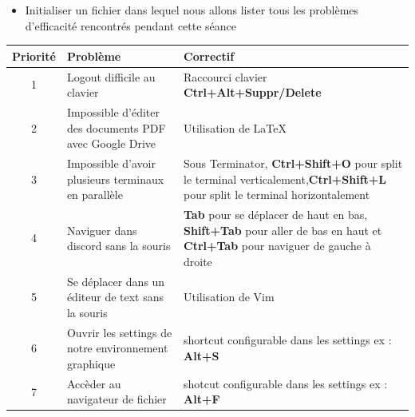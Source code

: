 \documentclass[12pt]{article}
\begin{document}
\begin{itemize}
	\item Initialiser un fichier dans lequel nous allons lister tous les problèmes d'efficacité rencontrés pendant cette séance
\end{itemize}
\vspace{0.3cm}

\begin{tabular}{|c|p{5cm}|p{10cm}|}
	\hline
	\textbf{Priorité} & \textbf{Problème} & \textbf{Correctif}\\ 
	\hline
	1 & Logout difficile au clavier & Raccourci clavier \textbf{Ctrl+Alt+Suppr/Delete}\\
	\hline
	2 & Impossible d'éditer des documents PDF avec Google Drive & Utilisation de LaTeX\\
	\hline
	3 & Impossible d'avoir plusieurs terminaux en parallèle & Sous Terminator, \textbf{Ctrl+Shift+O} pour split le terminal verticalement,\newline \textbf{Ctrl+Shift+L} pour split le terminal horizontalement\\ 
	\hline
	4 & Naviguer dans discord sans la souris & \textbf{Tab} pour se déplacer de haut en bas, \textbf{Shift+Tab} pour aller de bas en haut \newline et \textbf{Ctrl+Tab} pour naviguer de gauche à droite\\
	\hline 
	5 & Se déplacer dans un éditeur de text sans la souris & Utilisation de Vim\\
	\hline
	6 & Ouvrir les settings de notre environnement graphique & shortcut configurable dans les settings ex : \textbf{Alt+S}\\
	\hline
	7 & Accèder au navigateur de fichier & shotcut configurable dans les settings ex : \textbf{Alt+F}\\
	\hline
\end{tabular}

\vspace{0.3cm}
\end{document}
